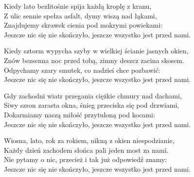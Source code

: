 \begin{text}
    \footnotesize{
    Kiedy lato bezlitośnie spija każdą kroplę z kranu,\\
    Z ulic sennie spełza asfalt, dymy wiszą nad łąkami,\\
    Znajdujemy skrawek cienia pod mokrymi powiekami:\\
    Jeszcze nic się nie skończyło, jeszcze wszystko jest przed nami.

    Kiedy sztorm wypycha szyby w wielkiej ścianie jasnych okien,\\
    Znów bezsenna noc przed tobą, zimny deszcz zacina skosem.\\
    Odpychamy szary smutek, co nadziei chce pozbawić:\\
    Jeszcze nic się nie skończyło, jeszcze wszystko jest przed nami.

    Gdy zachodni wiatr przegania ciężkie chmury nad dachami,\\
    Siwy szron zarasta okna, śnieg przeciska się pod drzwiami,\\
    Dokarmiamy naszą miłość przytuloną pod kocami:\\
    Jeszcze nic się nie skończyło, jeszcze wszystko jest przed nami.

    Wiosna, lato, rok za rokiem, nikną z okien niespodzianie,\\
    Każdy dzień zachodem słońca pali jeden most za nami.\\
    Nie pytamy o nic, przecież i tak już odpowiedź znamy:\\
    Jeszcze nic się nie skończyło, jeszcze wszystko jest przed nami.
    }
\end{text}
